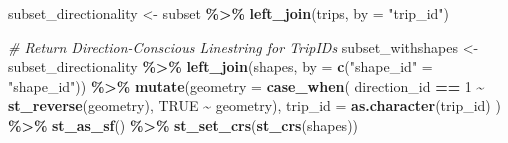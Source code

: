 \documentclass[
  12pt,
]{article}
\newenvironment{Shaded}{\begin{snugshade}}{\end{snugshade}}
\newcommand{\AttributeTok}[1]{\textcolor[rgb]{0.13,0.29,0.53}{#1}}
\newcommand{\CommentTok}[1]{\textcolor[rgb]{0.56,0.35,0.01}{\textit{#1}}}
\newcommand{\ConstantTok}[1]{\textcolor[rgb]{0.56,0.35,0.01}{#1}}
\newcommand{\DecValTok}[1]{\textcolor[rgb]{0.00,0.00,0.81}{#1}}
\newcommand{\FunctionTok}[1]{\textcolor[rgb]{0.13,0.29,0.53}{\textbf{#1}}}
\newcommand{\NormalTok}[1]{#1}
\newcommand{\OtherTok}[1]{\textcolor[rgb]{0.56,0.35,0.01}{#1}}
\newcommand{\SpecialCharTok}[1]{\textcolor[rgb]{0.81,0.36,0.00}{\textbf{#1}}}
\newcommand{\StringTok}[1]{\textcolor[rgb]{0.31,0.60,0.02}{#1}}
\begin{document}
\begin{Shaded}
\begin{Highlighting}[]
\NormalTok{subset\_directionality }\OtherTok{\textless{}{-}}\NormalTok{ subset }\SpecialCharTok{\%\textgreater{}\%}
  \FunctionTok{left\_join}\NormalTok{(trips,}
            \AttributeTok{by =} \StringTok{"trip\_id"}\NormalTok{)}

\CommentTok{\# Return Direction{-}Conscious Linestring for TripIDs}
\NormalTok{subset\_withshapes }\OtherTok{\textless{}{-}}\NormalTok{ subset\_directionality }\SpecialCharTok{\%\textgreater{}\%}
  \FunctionTok{left\_join}\NormalTok{(shapes,}
             \AttributeTok{by =} \FunctionTok{c}\NormalTok{(}\StringTok{"shape\_id"} \OtherTok{=} \StringTok{"shape\_id"}\NormalTok{)) }\SpecialCharTok{\%\textgreater{}\%}
  \FunctionTok{mutate}\NormalTok{(}\AttributeTok{geometry =} \FunctionTok{case\_when}\NormalTok{(}
\NormalTok{    direction\_id }\SpecialCharTok{==} \DecValTok{1} \SpecialCharTok{\textasciitilde{}} \FunctionTok{st\_reverse}\NormalTok{(geometry),}
    \ConstantTok{TRUE} \SpecialCharTok{\textasciitilde{}}\NormalTok{ geometry),}
    \AttributeTok{trip\_id =} \FunctionTok{as.character}\NormalTok{(trip\_id)}
\NormalTok{  ) }\SpecialCharTok{\%\textgreater{}\%}
  \FunctionTok{st\_as\_sf}\NormalTok{() }\SpecialCharTok{\%\textgreater{}\%}
  \FunctionTok{st\_set\_crs}\NormalTok{(}\FunctionTok{st\_crs}\NormalTok{(shapes))}


\end{Highlighting}
\end{Shaded}
\end{document}
